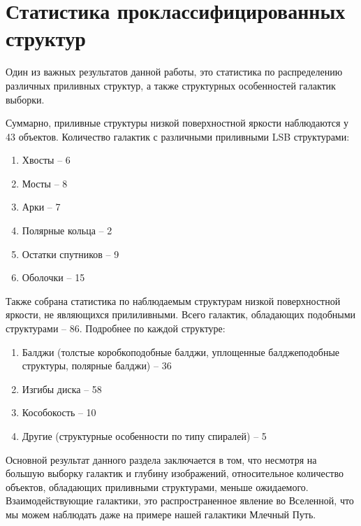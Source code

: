 \section{Статистика проклассифицированных структур}

Один из важных результатов данной работы, это статистика по распределению различных приливных структур, а также структурных особенностей галактик выборки.

Суммарно, приливные структуры низкой поверхностной яркости наблюдаются у 43 объектов. 
Количество галактик с различными приливными LSB структурами:
\begin{enumerate}
    \item Хвосты -- 6
    \item Мосты -- 8
    \item Арки -- 7
    \item Полярные кольца -- 2
    \item Остатки спутников -- 9
    \item Оболочки  -- 15
\end{enumerate}

Также собрана статистика по наблюдаемым структурам низкой поверхностной яркости, не являющихся прилиливными.
Всего галактик, обладающих подобными структурами – 86. Подробнее  по каждой структуре:
\begin{enumerate}
    \item Балджи (толстые коробкоподобные балджи, уплощенные балджеподобные структуры, полярные балджи)  --  36
    \item Изгибы диска  --  58
    \item Кособокость  --  10
    \item Другие (структурные особенности по типу спиралей)  --  5
\end{enumerate}

Основной результат данного раздела заключается в том, что несмотря на большую выборку галактик и глубину изображений, относительное количество объектов, обладающих приливными структурами, меньше ожидаемого. Взаимодействующие галактики, это распространенное явление во Вселенной, что мы можем наблюдать даже на примере нашей галактики Млечный Путь. 

